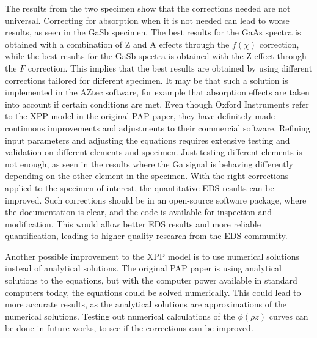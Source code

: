 The results from the two specimen show that the corrections needed are not universal.
Correcting for absorption when it is not needed can lead to worse results, as seen in the GaSb specimen.
The best results for the GaAs spectra is obtained with a combination of Z and A effects through the $f(\chi)$ correction, while the best results for the GaSb spectra is obtained with the Z effect through the $F$ correction.
This implies that the best results are obtained by using different corrections tailored for different specimen.
It may be that such a solution is implemented in the AZtec software, for example that absorption effects are taken into account if certain conditions are met.
Even though Oxford Instruments refer to the XPP model in the original PAP paper, they have definitely made continuous improvements and adjustments to their commercial software.
Refining input parameters and adjusting the equations requires extensive testing and validation on different elements and specimen.
Just testing different elements is not enough, as seen in the results where the Ga signal is behaving differently depending on the other element in the specimen.
With the right corrections applied to the specimen of interest, the quantitative EDS results can be improved.
Such corrections should be in an open-source software package, where the documentation is clear, and the code is available for inspection and modification.
This would allow better EDS results and more reliable quantification, leading to higher quality research from the EDS community.


Another possible improvement to the XPP model is to use numerical solutions instead of analytical solutions.
The original PAP paper is using analytical solutions to the equations, but with the computer power available in standard computers today, the equations could be solved numerically.
This could lead to more accurate results, as the analytical solutions are approximations of the numerical solutions.
Testing out numerical calculations of the $\phi(\rho z)$ curves can be done in future works, to see if the corrections can be improved.

